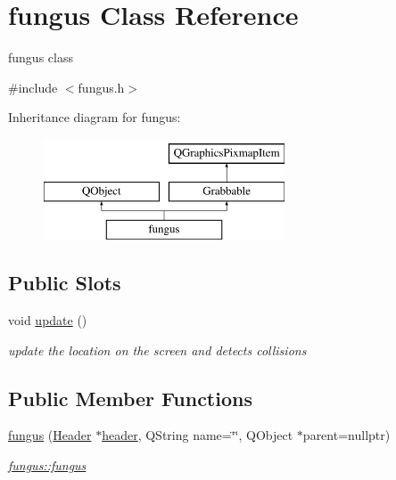 \hypertarget{classfungus}{\section{fungus Class Reference}
\label{classfungus}
}


fungus class  




{\ttfamily \#include $<$fungus.\-h$>$}

Inheritance diagram for fungus\-:\begin{figure}[H]
\begin{center}
\leavevmode
\includegraphics[height=3.000000cm]{classfungus}
\end{center}
\end{figure}
\subsection*{Public Slots}
\begin{DoxyCompactItemize}
\item 
void \hyperlink{classfungus_a2eb2952502ef6a467163a764f0cb773d}{update} ()
\begin{DoxyCompactList}\small\item\em update the location on the screen and detects collisions \end{DoxyCompactList}\end{DoxyCompactItemize}
\subsection*{Public Member Functions}
\begin{DoxyCompactItemize}
\item 
\hyperlink{classfungus_a5387ba07067ee3306649b4aa900b2c5d}{fungus} (\hyperlink{classHeader}{Header} $\ast$\hyperlink{classGrabbable_a97db8193dec83a8086352f80a30b2038}{header}, Q\-String name=\char`\"{}\char`\"{}, Q\-Object $\ast$parent=nullptr)
\begin{DoxyCompactList}\small\item\em \hyperlink{classfungus_a5387ba07067ee3306649b4aa900b2c5d}{fungus\-::fungus} \end{DoxyCompactList}\end{DoxyCompactItemize}
